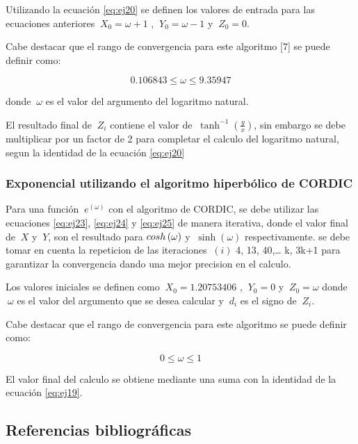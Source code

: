 Utilizando la ecuación \ref{eq:ej20} se definen los valores de entrada para las ecuaciones anteriores  $\ X_0 = \omega + 1$ , $\ Y_0 = \omega - 1$ y $\ Z_0 = 0 $.

Cabe destacar que el rango de convergencia para este algoritmo [7] se puede definir como: 

\begin{equation} \label{eq:ej26}
   0.106843 \leq \omega \leq 9.35947
\end{equation}

donde $\ \omega $ es el valor del argumento del logaritmo natural.

El resultado final de $\ Z_i $ contiene el valor de $\ \tanh^{-1} \left( \frac{y}{x} \right)$, sin embargo se debe multiplicar por un factor de 2 para completar el calculo del logaritmo natural, segun la identidad de la ecuación \ref{eq:ej20} 

\subsubsection{Exponencial utilizando el algoritmo hiperbólico de CORDIC }


Para una función  $\ e^{\left(\omega\right)} $  con el algoritmo de CORDIC, se debe utilizar las ecuaciones \ref{eq:ej23}, \ref{eq:ej24} y \ref{eq:ej25} de manera iterativa, donde el valor final de $\ X $ y $\ Y$, son el resultado para  $\\cosh\left(\omega\right)$ y $\ \sinh\left(\omega\right)$ respectivamente. se debe tomar en cuenta la repeticion de las iteraciones $\ \left(i\right) $ 4, 13, 40,… k, 3k+1 para garantizar la convergencia dando una mejor precision en el calculo.

Los valores iniciales se definen como  $\ X_0 = 1.20753406 $ , $\ Y_0 = 0$ y $\ Z_0 = \omega $ donde $\ \omega$  es el valor del argumento que se desea calcular y $\ d_i $ es el signo de $\ Z_i $.

Cabe destacar que el rango de convergencia para este algoritmo se puede definir como: 

\begin{equation} \label{eq:ej26}
   0 \leq \omega \leq 1
\end{equation}

El valor final del calculo se obtiene mediante una suma con la identidad de la ecuación \ref{eq:ej19}. 




\subsection{Referencias bibliográficas}

